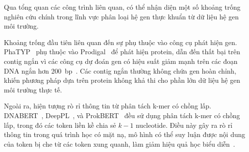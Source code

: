 \begin{table}[h]
\centering
\caption{So sánh tổng hợp các phương pháp phân loại hệ gen thực khuẩn}
\label{tab:comprehensive_method_comparison}
\end{table}

Qua tổng quan các công trình liên quan, có thể nhận diện một số khoảng trống nghiên cứu chính trong lĩnh vực phân loại hệ gen thực khuẩn từ dữ liệu hệ gen môi trường.

Khoảng trống đầu tiên liên quan đến sự phụ thuộc vào công cụ phát hiện gen. PhaTYP~\cite{shang2023phatyp} phụ thuộc vào Prodigal~\cite{hyatt2010prodigal} để phát hiện protein, dẫn đến thất bại trên contig ngắn vì các công cụ dự đoán gen có hiệu suất giảm mạnh trên các đoạn DNA ngắn hơn 200~bp~\cite{trimble2012short}. Các contig ngắn thường không chứa gen hoàn chỉnh, khiến phương pháp dựa trên protein không khả thi cho phần lớn dữ liệu hệ gen môi trường thực tế.

Ngoài ra, hiện tượng rò rỉ thông tin từ phân tách k-mer có chồng lấp. DNABERT~\cite{ji2021dnabert}, DeepPL~\cite{zhang2024deeppl}, và ProkBERT~\cite{ligeti2024prokbert} đều sử dụng phân tách k-mer có chồng lấp, trong đó các token liền kề chia sẻ $k-1$ nucleotide. Điều này gây ra rò rỉ thông tin trong quá trình học có mặt nạ, mô hình có thể suy luận được nội dung của token bị che từ các token xung quanh, làm giảm hiệu quả học biểu diễn~\cite{zhou2023dnabert}.

